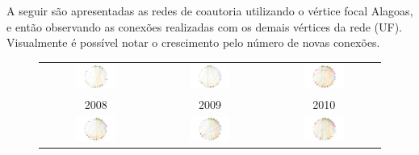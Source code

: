 A seguir são apresentadas as redes de coautoria utilizando o vértice focal Alagoas, e então observando as conexões realizadas com os demais vértices da rede (UF). Visualmente é possível notar o crescimento pelo número de novas conexões.


\begin{figure}[H]
	\begin{tabular}{ccc}
		\includegraphics[width=0.38\textwidth]{Imagens/rede-al-2008.pdf} &   \includegraphics[width=0.38\textwidth]{Imagens/rede-al-2009.pdf} &
		\includegraphics[width=0.38\textwidth]{Imagens/rede-al-2010.pdf}\\
		2008 & 2009 & 2010\\[6pt] 
		\includegraphics[width=0.38\textwidth]{Imagens/rede-al-2011.pdf} &
		\includegraphics[width=0.38\textwidth]{Imagens/rede-al-2012.pdf} &   \includegraphics[width=0.38\textwidth]{Imagens/rede-al-2013.pdf} \\

\end{tabular}
\end{figure}
